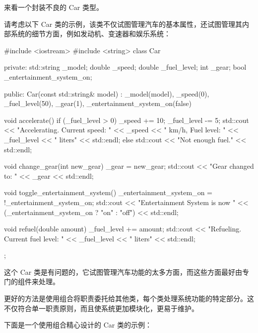 来看一个封装不良的 Car 类型。

请考虑以下 Car 类的示例，该类不仅试图管理汽车的基本属性，还试图管理其内部系统的细节方面，例如发动机、变速器和娱乐系统：

\begin{cpp}
#include <iostream>
#include <string>
class Car {
private:
    std::string _model;
    double _speed;
    double _fuel_level;
    int _gear;
    bool _entertainment_system_on;

public:
    Car(const std::string& model) : _model(model), _speed(0), _fuel_level(50), _gear(1), _entertainment_system_on(false) {}

    void accelerate() {
        if (_fuel_level > 0) {
            _speed += 10;
            _fuel_level -= 5;
            std::cout << "Accelerating. Current speed: " << _speed <<
            " km/h, Fuel level: " << _fuel_level << " liters" << std::endl;
        } else {
            std::cout << "Not enough fuel." << std::endl;
        }
    }

    void change_gear(int new_gear) {
        _gear = new_gear;
        std::cout << "Gear changed to: " << _gear << std::endl;
    }

    void toggle_entertainment_system() {
        _entertainment_system_on = !_entertainment_system_on;
        std::cout << "Entertainment System is now " << (_entertainment_system_on ? "on" : "off") << std::endl;
    }

    void refuel(double amount) {
        _fuel_level += amount;
        std::cout << "Refueling. Current fuel level: " << _fuel_level << " liters" << std::endl;
    }
};
\end{cpp}

这个 Car 类是有问题的，它试图管理汽车功能的太多方面，而这些方面最好由专门的组件来处理。


更好的方法是使用组合将职责委托给其他类，每个类处理系统功能的特定部分。这不仅符合单一职责原则，而且使系统更加模块化，更易于维护。

下面是一个使用组合精心设计的 Car 类的示例：

